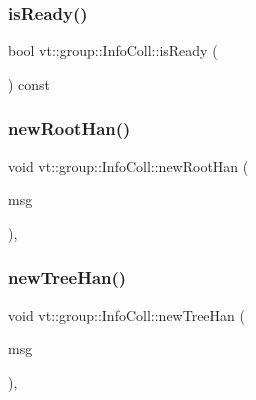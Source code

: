 \subsubsection{\texorpdfstring{is\+Ready()}{isReady()}}
{\footnotesize\ttfamily bool vt\+::group\+::\+Info\+Coll\+::is\+Ready (\begin{DoxyParamCaption}{ }\end{DoxyParamCaption}) const}

\mbox{\label{structvt_1_1group_1_1_info_coll_a1c37f69107e014a3aef10346e5ebe0c7}} 
\subsubsection{\texorpdfstring{new\+Root\+Han()}{newRootHan()}}
{\footnotesize\ttfamily void vt\+::group\+::\+Info\+Coll\+::new\+Root\+Han (\begin{DoxyParamCaption}\item[{\hyperlink{namespacevt_1_1group_a4c1183efe0185992fefb3ab38a55a8a7}{Group\+Collective\+Msg} $\ast$}]{msg }\end{DoxyParamCaption})\hspace{0.3cm}{\ttfamily [static]}, {\ttfamily [protected]}}

\mbox{\label{structvt_1_1group_1_1_info_coll_ac0054acdfecccf525613a95997d79e20}} 
\subsubsection{\texorpdfstring{new\+Tree\+Han()}{newTreeHan()}}
{\footnotesize\ttfamily void vt\+::group\+::\+Info\+Coll\+::new\+Tree\+Han (\begin{DoxyParamCaption}\item[{\hyperlink{namespacevt_1_1group_a864fcf6bc821eacf8350bf4ad15e51b3}{Group\+Only\+Msg} $\ast$}]{msg }\end{DoxyParamCaption})\hspace{0.3cm}{\ttfamily [static]}, {\ttfamily [protected]}}

